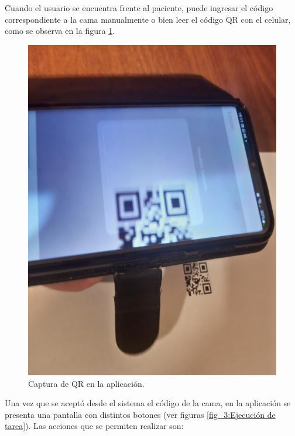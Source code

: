 Cuando el usuario se encuentra frente al paciente, puede ingresar el código correspondiente a la cama manualmente o bien leer el código QR con el celular, como se observa en la figura \ref{fig: Captura de QR en la aplicación.}.

\begin{figure}[ht]
	\centering
	\includegraphics[scale=.05]{./Figures/app/capturaQR.jpg}
	\caption{ Captura de QR en la aplicación.}
	\label{fig: Captura de QR en la aplicación.}
\end{figure} 


Una vez que se aceptó desde el sistema el código de la cama, en la aplicación se presenta una pantalla con distintos botones (ver figuras \ref{fig_3:Ejecución de tarea}). Las acciones que se permiten realizar son:


